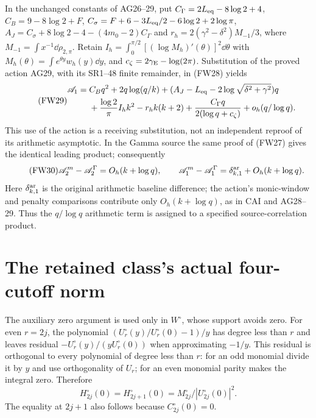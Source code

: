 \documentclass[11pt]{article}
\begin{document}
In the unchanged constants of AG26--29, put
$C_\Gamma=2L_{\rm eq}-8\log2+4$,
$C_B=9-8\log2+F$, $C_\sigma=F+6-3L_{\rm eq}/2-6\log2+2\log\pi$,
$A_J=C_\sigma+8\log2-4-(4m_0-2)C_\Gamma$ and
$r_h=2(\gamma^2-\delta^2)M_{-1}/3$, where
$M_{-1}=\int x^{-1}\dd\rho_{2,\pi}$.
Retain $I_h=\int_0^{\pi/2}[(\log M_h)'(\theta)]^2\dd\theta$ with
$M_h(\theta)=\int e^{\theta y}w_h(y)\dd y$, and
$c_\zeta=2\gamma_{\rm E}-\log(2\pi)$.
Substitution of the proved action AG29, with its SR1--48 finite remainder,
in (FW28) yields
\begin{equation}\tag{FW29}\begin{aligned}
 \mathscr A_1={}&C_Bq^2+2q\log(q/k)
 +(A_J-L_{\rm eq}-2\log\sqrt{\delta^2+\gamma^2})q\\
 &+\frac{\log2}{\pi}I_hk^2-r_hk(k+2)
 +\frac{C_\Gamma q}{2(\log q+c_\zeta)}+o_h(q/\log q).
\end{aligned}\end{equation}
This use of the action is a receiving substitution, not an independent
reproof of its arithmetic asymptotic. In the Gamma source the same
proof of (FW27) gives the identical leading product; consequently
\begin{equation}\tag{FW30}
 \mathscr A_2^m-\mathscr A_2^\Gamma=O_h(k+\log q),\qquad
 \mathscr A_1^m-\mathscr A_1^\Gamma
 =\delta_{k,1}^{\rm ar}+O_h(k+\log q).
\end{equation}
Here $\delta_{k,1}^{\rm ar}$ is the original arithmetic baseline
difference; the action's monic-window and penalty comparisons contribute
only $O_h(k+\log q)$, as in CAI and AG28--29. Thus the $q/\log q$
arithmetic term is assigned to a specified source-correlation product.

\section{The retained class's actual four-cutoff norm}
The auxiliary zero argument is used only in $W^\circ$, whose support
avoids zero. For even $r=2j$, the polynomial
$(U_r^\circ(y)/U_r^\circ(0)-1)/y$ has degree less than $r$ and leaves
residual $-U_r^\circ(y)/(yU_r^\circ(0))$ when approximating $-1/y$.
This residual is orthogonal to every polynomial of degree less than $r$:
for an odd monomial divide it by $y$ and use orthogonality of $U_r$;
for an even monomial parity makes the integral zero. Therefore
\begin{equation}\tag{FW31}
 H_{2j}^\circ(0)=H_{2j+1}^\circ(0)
                  =M_{2j}^\circ/|U_{2j}^\circ(0)|^2.
\end{equation}
The equality at $2j+1$ also follows because $C_{2j}^\circ(0)=0$.
\end{document}
